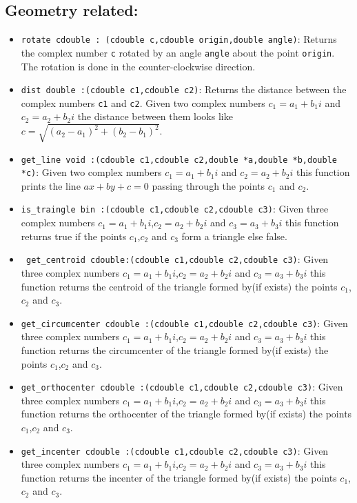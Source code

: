\documentclass[12pt]{article}
\begin{document}
\subsection{Geometry related:}
\begin{itemize}
    \item \texttt{rotate cdouble : (cdouble c,cdouble origin,double angle)}: Returns the complex number \texttt{c} rotated by an angle \texttt{angle} about the point \texttt{origin}. The rotation is done in the counter-clockwise direction.    
    \item \texttt{dist double :(cdouble c1,cdouble c2)}: Returns the distance between the complex numbers \texttt{c1} and \texttt{c2}. Given two complex numbers $c_1=a_1+b_1i$ and $c_2=a_2+b_2i$ the distance between them looks like $c=\sqrt{(a_2-a_1)^2+(b_2-b_1)^2}$.
    \item \texttt{get\_line void :(cdouble c1,cdouble c2,double *a,double *b,double *c)}: Given two complex numbers $c_1=a_1+b_1i$ and $c_2=a_2+b_2i$ this function prints the line $ax+by+c=0$ passing through the points $c_1$ and $c_2$.
    \item \texttt{is\_traingle bin :(cdouble c1,cdouble c2,cdouble c3)}: Given three complex numbers $c_1=a_1+b_1i$,$c_2=a_2+b_2i$ and $c_3=a_3+b_3i$ this function returns true if the points $c_1$,$c_2$ and $c_3$ form a triangle else false.
    \item \texttt{ get\_centroid cdouble:(cdouble c1,cdouble c2,cdouble c3)}: Given three complex numbers $c_1=a_1+b_1i$,$c_2=a_2+b_2i$ and $c_3=a_3+b_3i$ this function returns the centroid of the triangle formed by(if exists) the points $c_1$,$c_2$ and $c_3$.
    \item \texttt{get\_circumcenter cdouble :(cdouble c1,cdouble c2,cdouble c3)}: Given three complex numbers $c_1=a_1+b_1i$,$c_2=a_2+b_2i$ and $c_3=a_3+b_3i$ this function returns the circumcenter of the triangle formed by(if exists) the points $c_1$,$c_2$ and $c_3$.
    \item \texttt{get\_orthocenter cdouble :(cdouble c1,cdouble c2,cdouble c3)}: Given three complex numbers $c_1=a_1+b_1i$,$c_2=a_2+b_2i$ and $c_3=a_3+b_3i$ this function returns the orthocenter of the triangle formed by(if exists) the points $c_1$,$c_2$ and $c_3$.
    \item \texttt{get\_incenter cdouble :(cdouble c1,cdouble c2,cdouble c3)}: Given three complex numbers $c_1=a_1+b_1i$,$c_2=a_2+b_2i$ and $c_3=a_3+b_3i$ this function returns the incenter of the triangle formed by(if exists) the points $c_1$,$c_2$ and $c_3$.

\end{itemize}
\end{document}
